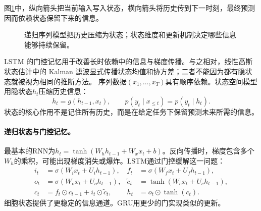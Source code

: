 图\ref{fig:sequence-recurrent-state}中，纵向箭头把当前输入写入状态，横向箭头将历史传到下一时刻，最终预测因而依赖状态保留下来的信息。
\begin{figure}[htbp]
\centering
{}
\caption{递归序列模型把历史压缩为状态；状态维度和更新机制决定哪些信息能够持续保留。}
\label{fig:sequence-recurrent-state}
\end{figure}
LSTM 的门控记忆用于改善长时依赖中的信息与梯度传播\cite{hochreiter1997lstm}。与之相对，线性高斯状态估计中的 Kalman 滤波显式传播状态均值和协方差\cite{kalman1960filter}；二者不能因为都有隐状态就被视为相同的推断方法。
序列数据$(x_1,\ldots,x_T)$具有顺序依赖。状态空间模型用隐状态$h_t$压缩历史信息：
\begin{equation}
 h_t=g(h_{t-1},x_t),\qquad p(y_t\mid x_{\leq t})=p(y_t\mid h_t).
\end{equation}
状态的核心作用不是记住所有历史，而是在给定任务下保留预测未来所需的信息。

\paragraph{递归状态与门控记忆。}
最基本的RNN为$h_t=\tanh(W_hh_{t-1}+W_xx_t+b)$。反向传播时，梯度包含多个$W_h$的乘积，可能出现梯度消失或爆炸。LSTM通过门控缓解这一问题：
\begin{align}
 i_t&=\sigma(W_ix_t+U_ih_{t-1}),& f_t&=\sigma(W_fx_t+U_fh_{t-1}),\label{eq:sequence-lstm-input-forget}\\
 o_t&=\sigma(W_ox_t+U_oh_{t-1}),& \tilde c_t&=\tanh(W_cx_t+U_ch_{t-1}),\label{eq:sequence-lstm-output-candidate}\\
 c_t&=f_t\odot c_{t-1}+i_t\odot\tilde c_t,& h_t&=o_t\odot\tanh(c_t).
\end{align}
细胞状态提供了更稳定的信息通道。GRU用更少的门实现类似的更新。


